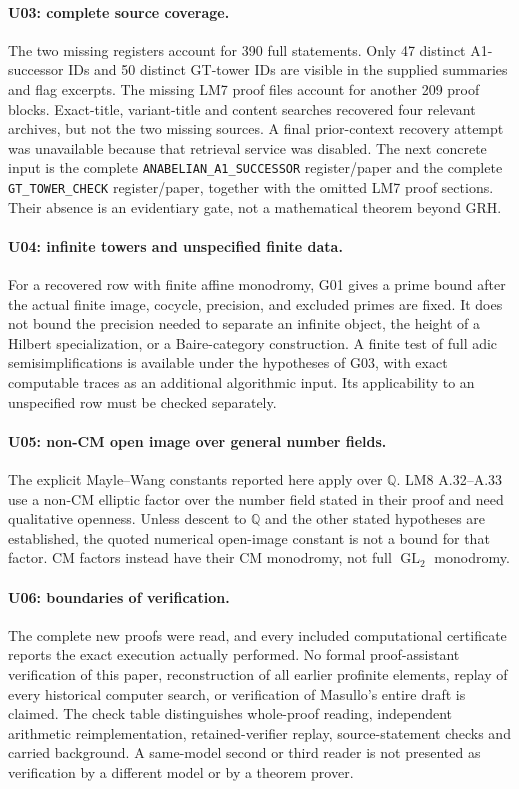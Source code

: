 \paragraph{U03: complete source coverage.}
The two missing registers account for 390 full statements. Only
47 distinct A1-successor IDs and 50 distinct GT-tower IDs are visible
in the supplied summaries and flag excerpts. The missing LM7
proof files account for another 209 proof blocks. Exact-title,
variant-title and content searches recovered four relevant archives,
but not the two missing sources. A final prior-context recovery
attempt was unavailable because that retrieval service was disabled.
The next concrete input is the complete
\texttt{ANABELIAN\_A1\_SUCCESSOR} register/paper and the complete
\texttt{GT\_TOWER\_CHECK} register/paper, together with the omitted
LM7 proof sections. Their absence is an evidentiary gate, not a
mathematical theorem beyond GRH.

\paragraph{U04: infinite towers and unspecified finite data.}
For a recovered row with finite affine monodromy, G01 gives a
prime bound after the actual finite image, cocycle, precision,
and excluded primes are fixed. It does not bound the precision
needed to separate an infinite object, the height of a Hilbert
specialization, or a Baire-category construction. A finite test of
full adic semisimplifications is available under the hypotheses of
G03, with exact computable traces as an additional algorithmic input.
Its applicability to an unspecified row must be checked separately.

\paragraph{U05: non-CM open image over general number fields.}
The explicit Mayle--Wang constants reported here apply over
$\mathbb Q$. LM8 A.32--A.33 use a non-CM elliptic factor over the
number field stated in their proof and need qualitative openness.
Unless descent to $\mathbb Q$ and the other stated hypotheses are
established, the quoted numerical open-image constant is not a
bound for that factor. CM factors instead have their CM monodromy,
not full $\operatorname{GL}_2$ monodromy.

\paragraph{U06: boundaries of verification.}
The complete new proofs were read, and every included computational
certificate reports the exact execution actually performed. No
formal proof-assistant verification of this paper, reconstruction
of all earlier profinite elements, replay of every historical
computer search, or verification of Masullo's entire draft is
claimed. The check table distinguishes whole-proof reading,
independent arithmetic reimplementation, retained-verifier replay,
source-statement checks and carried background. A same-model second
or third reader is not presented as verification by a different
model or by a theorem prover.
